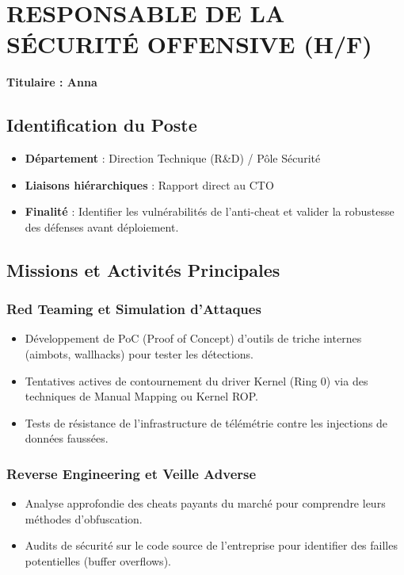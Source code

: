 \documentclass[12pt,a4paper]{article}
\begin{document}
\newpage

\section{RESPONSABLE DE LA SÉCURITÉ OFFENSIVE (H/F)}
\textbf{Titulaire : Anna}

\subsection{Identification du Poste}
\begin{itemize}[label=\textbullet]
    \item \textbf{Département} : Direction Technique (R\&D) / Pôle Sécurité
    \item \textbf{Liaisons hiérarchiques} : Rapport direct au CTO
    \item \textbf{Finalité} : Identifier les vulnérabilités de l'anti-cheat et valider la robustesse des défenses avant déploiement.
\end{itemize}

\subsection{Missions et Activités Principales}

\subsubsection{Red Teaming et Simulation d'Attaques}
\begin{itemize}[label=\textbullet]
    \item Développement de PoC (Proof of Concept) d'outils de triche internes (aimbots, wallhacks) pour tester les détections.
    \item Tentatives actives de contournement du driver Kernel (Ring 0) via des techniques de Manual Mapping ou Kernel ROP.
    \item Tests de résistance de l'infrastructure de télémétrie contre les injections de données faussées.
\end{itemize}

\subsubsection{Reverse Engineering et Veille Adverse}
\begin{itemize}[label=\textbullet]
    \item Analyse approfondie des cheats payants du marché pour comprendre leurs méthodes d'obfuscation.
    \item Audits de sécurité sur le code source de l'entreprise pour identifier des failles potentielles (buffer overflows).
\end{itemize}
\end{document}
